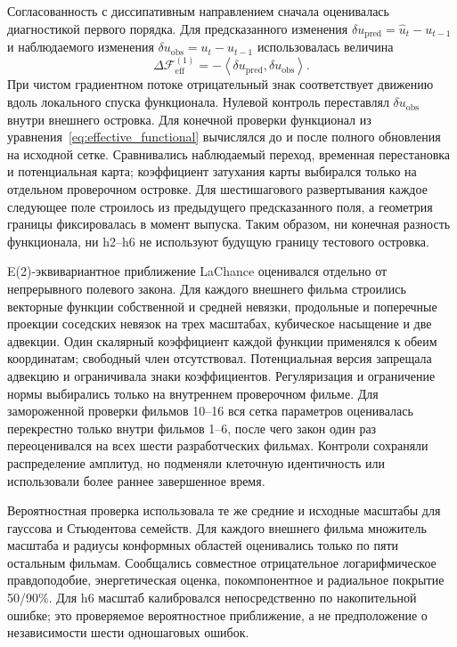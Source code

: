 \documentclass[11pt,a4paper]{article}
\begin{document}
Согласованность с диссипативным направлением сначала оценивалась диагностикой первого порядка. Для предсказанного изменения $\delta u_{\mathrm{pred}}=\widehat u_t-u_{t-1}$ и наблюдаемого изменения $\delta u_{\mathrm{obs}}=u_t-u_{t-1}$ использовалась величина
\begin{equation}
\Delta\mathcal F_{\mathrm{eff}}^{(1)}
=-\left\langle\delta u_{\mathrm{pred}},\delta u_{\mathrm{obs}}\right\rangle .
\end{equation}
При чистом градиентном потоке отрицательный знак соответствует движению вдоль локального спуска функционала. Нулевой контроль переставлял $\delta u_{\mathrm{obs}}$ внутри внешнего островка. Для конечной проверки функционал из уравнения~\eqref{eq:effective_functional} вычислялся до и после полного обновления на исходной сетке. Сравнивались наблюдаемый переход, временная перестановка и потенциальная карта; коэффициент затухания карты выбирался только на отдельном проверочном островке. Для шестишагового развертывания каждое следующее поле строилось из предыдущего предсказанного поля, а геометрия границы фиксировалась в момент выпуска. Таким образом, ни конечная разность функционала, ни h2--h6 не используют будущую границу тестового островка.

E(2)-эквивариантное приближение LaChance оценивался отдельно от непрерывного полевого закона. Для каждого внешнего фильма строились векторные функции собственной и средней невязки, продольные и поперечные проекции соседских невязок на трех масштабах, кубическое насыщение и две адвекции. Один скалярный коэффициент каждой функции применялся к обеим координатам; свободный член отсутствовал. Потенциальная версия запрещала адвекцию и ограничивала знаки коэффициентов. Регуляризация и ограничение нормы выбирались только на внутреннем проверочном фильме. Для замороженной проверки фильмов 10--16 вся сетка параметров оценивалась перекрестно только внутри фильмов 1--6, после чего закон один раз переоценивался на всех шести разработческих фильмах. Контроли сохраняли распределение амплитуд, но подменяли клеточную идентичность или использовали более раннее завершенное время.

Вероятностная проверка использовала те же средние и исходные масштабы для гауссова и Стьюдентова семейств. Для каждого внешнего фильма множитель масштаба и радиусы конформных областей оценивались только по пяти остальным фильмам. Сообщались совместное отрицательное логарифмическое правдоподобие, энергетическая оценка, покомпонентное и радиальное покрытие 50/90\%. Для h6 масштаб калибровался непосредственно по накопительной ошибке; это проверяемое вероятностное приближение, а не предположение о независимости шести одношаговых ошибок.
\end{document}
